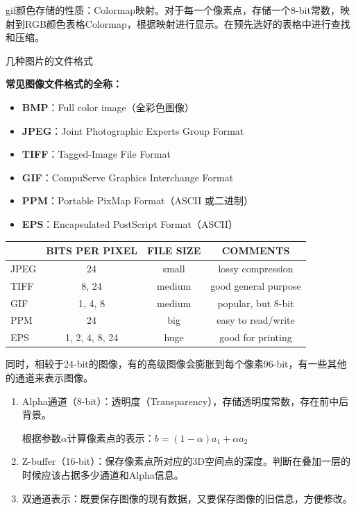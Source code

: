 \documentclass{ctexart}
\theoremstyle{cnthm}
\begin{document}
gif颜色存储的性质：Colormap映射。对于每一个像素点，存储一个8-bit常数，映射到RGB颜色表格Colormap，根据映射进行显示。在预先选好的表格中进行查找和压缩。

\begin{fancybox}{几种图片的文件格式}

\textbf{常见图像文件格式的全称：}
\begin{itemize}[leftmargin=1.6em,itemsep=1pt,topsep=3pt,parsep=0pt]
    \item \textbf{BMP}：Full color image（全彩色图像）
    \item \textbf{JPEG}：Joint Photographic Experts Group Format
    \item \textbf{TIFF}：Tagged-Image File Format
    \item \textbf{GIF}：CompuServe Graphics Interchange Format
    \item \textbf{PPM}：Portable PixMap Format（ASCII 或二进制）
    \item \textbf{EPS}：Encapsulated PostScript Format（ASCII）
\end{itemize}

\vspace{2pt}
\begin{center}
\small
\begin{tabular}{lccc}
\toprule
 & \textbf{BITS PER PIXEL} & \textbf{FILE SIZE} & \textbf{COMMENTS} \\
\midrule
JPEG & 24            & small  & lossy compression \\
TIFF & 8, 24         & medium & good general purpose \\
GIF  & 1, 4, 8       & medium & popular, but 8-bit \\
PPM  & 24            & big    & easy to read/write \\
EPS  & 1, 2, 4, 8, 24 & huge  & good for printing \\
\bottomrule
\end{tabular}
\end{center}
\end{fancybox}

同时，相较于24-bit的图像，有的高级图像会膨胀到每个像素96-bit，有一些其他的通道来表示图像。

\begin{enumerate}
    \item Alpha通道（8-bit）：透明度（Transparency），存储透明度常数，存在前中后背景。
    
    根据参数$\alpha$计算像素点的表示：$b = (1-\alpha) a_1 + \alpha a_2$
    \item Z-buffer（16-bit）：保存像素点所对应的3D空间点的深度。判断在叠加一层的时候应该占据多少通道和Alpha信息。
    
    \item 双通道表示：既要保存图像的现有数据，又要保存图像的旧信息，方便修改。
\end{enumerate}
\end{document}
